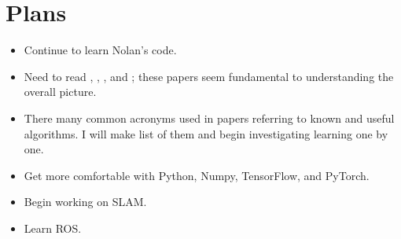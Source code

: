 \documentclass[11pt]{article}
\begin{document}
\section{Plans}
\begin{itemize}
 \item Continue to learn Nolan's code. 

 \item Need to read \cite{ImSRwDeepCNN}, \cite{MixDNNforSISR}, \cite{mModalSemanticSLAMwProb}, and \cite{RCANforImClass}; these papers seem fundamental to understanding the overall picture. 
   
 \item There many common acronyms used in papers referring to known and useful algorithms. I will make list of them and begin investigating learning one by one. 

 \item Get more comfortable with Python, Numpy, TensorFlow, and PyTorch. 

 \item Begin working on SLAM. 

 \item Learn ROS.

\end{itemize}

\newpage 
 

\end{document}
